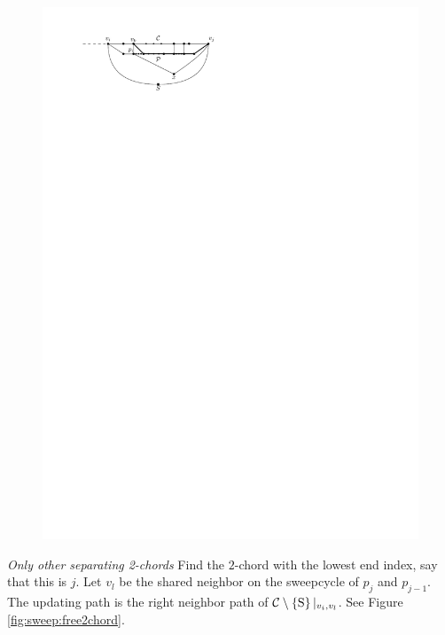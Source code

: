     \begin{figure}[h]
      \centering
      \includegraphics[scale=1]{unifiedAlgo/img/sweep/pEBound}
      \caption{}
      \label{fig:sweep:pEBound}
    \end{figure}
    \emph{Only other separating 2-chords}
      Find the $2$-chord with the lowest end index, say that this is $j$.
      Let $v_l$ be the shared neighbor on the sweepcycle of $p_{j}$ and $p_{j-1}$.
      The updating path is the right neighbor path of $\mathcal{C} \setminus \left\lbrace {\mathrm{S}} \right\rbrace|_{v_i, v_l}$. See Figure \ref{fig:sweep:free2chord}.

